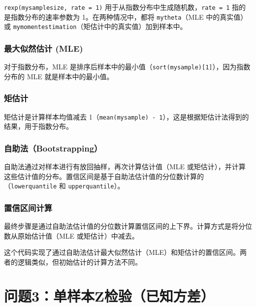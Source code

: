 \documentclass[UTF8]{report}
\theoremstyle{MyLineTheoremStyle} %
\theoremstyle{MyBlockTheoremStyle} %
\theoremstyle{MySubsubsectionStyle} %
\begin{document}
\texttt{rexp(mysamplesize, rate = 1)} 用于从指数分布中生成随机数，\texttt{rate = 1} 指的是指数分布的速率参数为 1。在两种情况中，都将 \texttt{mytheta}（MLE 中的真实值）或 \texttt{mymomentestimation}（矩估计中的真实值）加到样本中。

\subsection*{最大似然估计 (MLE)}

对于指数分布，MLE 是排序后样本中的最小值（\texttt{sort(mysample)[1]}），因为指数分布的 MLE 就是样本中的最小值。

\subsection*{矩估计}

矩估计是计算样本均值减去 1（\texttt{mean(mysample) - 1}），这是根据矩估计法得到的结果，用于指数分布。

\subsection*{自助法（Bootstrapping）}

自助法通过对样本进行有放回抽样，再次计算估计值（MLE 或矩估计），并计算这些估计值的分布。置信区间是基于自助法估计值的分位数计算的（\texttt{lowerquantile} 和 \texttt{upperquantile}）。

\subsection*{置信区间计算}

最终步骤是通过自助法估计值的分位数计算置信区间的上下界。计算方式是将分位数从原始估计值（MLE 或矩估计）中减去。

这个代码实现了通过自助法估计最大似然估计（MLE）和矩估计的置信区间。两者的逻辑类似，但初始估计的计算方法不同。







\chapter{问题3：单样本Z检验（已知方差）}
\end{document}
